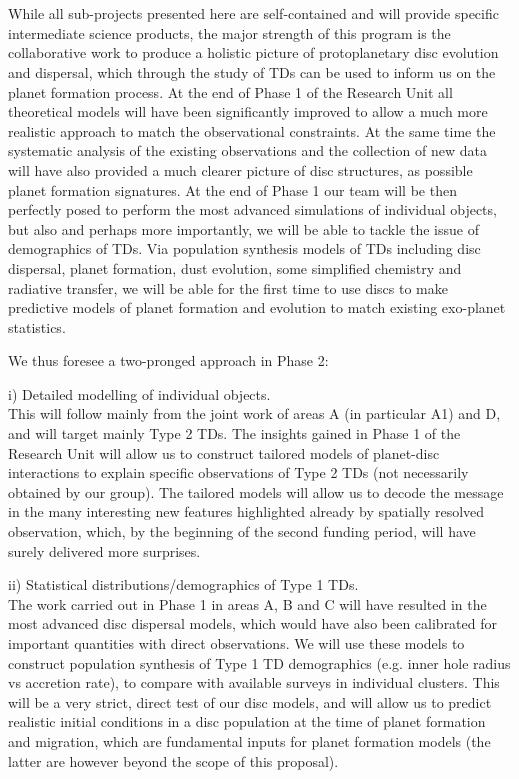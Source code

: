 \documentclass[12pt]{article}
\begin{document}
\mbox{}\vspace{1em}\\
\\
%
While all sub-projects presented here are self-contained and will
provide specific intermediate science products, the major strength of this program is the collaborative
work to produce a holistic picture of protoplanetary disc evolution
and dispersal, which through the study of TDs can be used
to inform us on the planet formation process. At the end of Phase 1 of
the Research Unit all theoretical models will have been significantly
improved to allow a much more realistic approach to match the
observational constraints. At the same time the systematic analysis of
the existing observations and the collection of new data will have also
provided a much clearer picture of disc structures, as possible planet
formation signatures. At the end of Phase 1 our team will be then
perfectly posed to perform the most advanced simulations of individual
objects, but also and perhaps more importantly, we will be able to
tackle the issue of demographics of TDs. Via population
synthesis models of TDs including disc dispersal, planet formation, dust
evolution, some simplified chemistry and radiative transfer, we will
be able for the first time to use discs to make predictive models of
planet formation and evolution to match existing exo-planet
statistics. 

We thus foresee a two-pronged approach in Phase 2: 

i) Detailed modelling of individual objects.\\
This will follow mainly from the joint work of areas A (in particular
A1) and D, and will target mainly Type 2 TDs. The insights gained in
Phase 1 of the Research Unit will allow us to construct tailored
models of planet-disc interactions to explain specific observations of
Type 2 TDs (not necessarily obtained by our group). The tailored
models will allow us to decode the message in the many interesting new
features highlighted already by spatially resolved observation, which,
by the beginning of the second funding period, will have surely
delivered more surprises.  

ii) Statistical distributions/demographics of Type 1 TDs. \\
The work carried out in Phase 1 in areas A, B and C will have resulted
in the most advanced disc dispersal models, which would have also been
calibrated for important quantities with direct observations. We will
use these models to construct population synthesis of Type 1
TD demographics (e.g. inner hole radius vs accretion
rate), to compare with available surveys in individual clusters.  
This will be a very strict, direct test of our disc models, and will
allow us to predict realistic initial conditions in a disc population at the
time of planet formation and migration, which are fundamental inputs
for planet formation models (the latter are however beyond the scope of this
proposal).  
\end{document}
